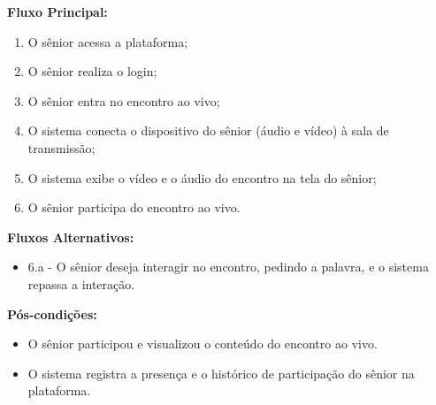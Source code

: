\vspace{\baselineskip}
\textbf{Fluxo Principal: }
\begin{enumerate}
    \item O sênior acessa a plataforma;
    \item O sênior realiza o login;
    \item O sênior entra no encontro ao vivo;
    \item O sistema conecta o dispositivo do sênior (áudio e vídeo) à sala de transmissão;
    \item O sistema exibe o vídeo e o áudio do encontro na tela do sênior;
    \item O sênior participa do encontro ao vivo.
\end{enumerate}

\vspace{\baselineskip}
\textbf{Fluxos Alternativos: }
\begin{itemize}
    \item 6.a - O sênior deseja interagir no encontro, pedindo a palavra,  e o sistema repassa a interação.
\end{itemize}

\vspace{\baselineskip}
\textbf{Pós-condições: }
\begin{itemize}
    \item O sênior participou e visualizou o conteúdo do encontro ao vivo. 
    \item O sistema registra a presença e o histórico de participação do sênior na plataforma.
\end{itemize}